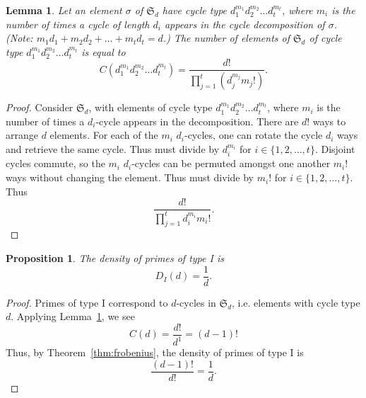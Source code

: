 \documentclass[11pt]{article}
\theoremstyle{plain}
\newtheorem{lemma}[theorem]{Lemma}
\newtheorem{proposition}[theorem]{Proposition}
\theoremstyle{definition}
\theoremstyle{remark}
\numberwithin{equation}{section}
\numberwithin{table}{section}
\renewcommand{\SS}{\mathfrak{S}}
\begin{document}
\begin{lemma}\label{lem:cycletype}
  Let an element $\sigma$ of $\SS_d$ have cycle type $d_1^{m_1}d_2^{m_2}\ldots d_t^{m_t}$, 
  where $m_i$ is the number of times a cycle of length $d_i$ appears in the cycle
  decomposition of $\sigma$. (Note: $m_1d_1+m_2d_2+\ldots +m_td_t=d$.) The number
   of elements of $\SS_d$ of cycle type $d_1^{m_1}d_2^{m_2}\ldots d_t^{m_t}$ is equal to
  \begin{equation*}
    C(d_1^{m_1}d_2^{m_2}\ldots d_t^{m_t})=\frac{d!}{\prod_{j=1}^t\left(d_j^{m_j}m_j!\right)}.
  \end{equation*}


\end{lemma}
\begin{proof}
  Consider $\SS_d$, with elements of cycle type $d_1^{m_1} d_2^{m_2} \ldots d_t^{m_t}$, 
  where $m_i$ is the number of times a $d_i$-cycle appears in the decomposition.
  There are $d!$ ways to arrange $d$ elements.
  For each of the $m_i$ $d_i$-cycles, one can rotate the cycle $d_i$ ways and retrieve the 
  same cycle. Thus must divide by $d_i^{m_i}$ for $i \in \{1,2,\ldots,t\}$.
  Disjoint cycles commute, so the $m_i$ $d_i$-cycles can be permuted amongst one another 
  $m_i!$ ways without changing the element. Thus must divide by $m_i!$ for $i \in \{1,2,\ldots,t\}$.
  Thus
  \begin{equation*}
    \frac{d!}{\prod_{j=1}^t d_i^{m_i} m_i!}.
  \end{equation*}
\end{proof}

\begin{proposition}
  The density of primes of type I is 
  \begin{equation*}
    D_I(d)=\frac{1}{d}.
  \end{equation*}
\end{proposition}
\begin{proof}
  Primes of type I correspond to $d$-cycles in $\SS_d$, i.e. elements with 
  cycle type $d$. Applying Lemma~\ref{lem:cycletype}, we see
  \begin{equation*}
    C(d)=\frac{d!}{d^1}=(d-1)!
  \end{equation*}
  Thus, by Theorem~\ref{thm:frobenius}, the density of primes of type I is
  \begin{equation*}
    \frac{(d-1)!}{d!}=\frac{1}{d}.
  \end{equation*}
\end{proof}
\end{document}
